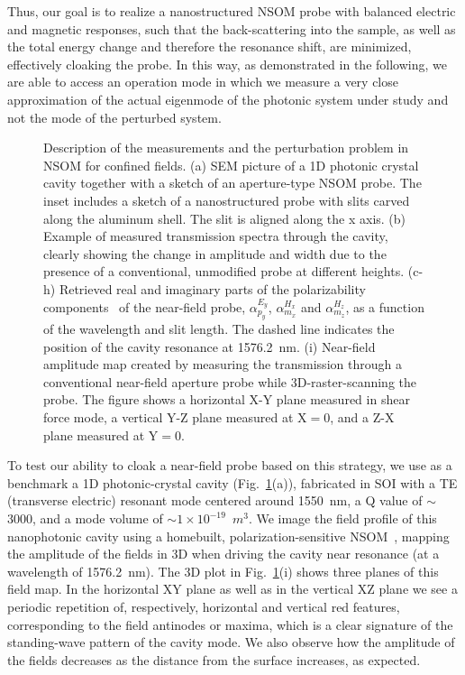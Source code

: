 \documentclass{osa-article}
\begin{document}
	Thus, our goal is to realize a nanostructured NSOM probe with balanced electric and magnetic responses, such that the back-scattering into the sample, as well as the total energy change and therefore the resonance shift, are minimized, effectively cloaking the probe. In this way, as demonstrated in the following, we are able to access an operation mode in which we measure a very close approximation of the actual eigenmode of the photonic system under study and not the mode of the perturbed system.\par
	
	\begin{figure}[htb!]
		\caption{Description of the measurements and the perturbation problem in NSOM for confined fields. (a) SEM picture of a 1D photonic crystal cavity together with a sketch of an aperture-type NSOM probe. The inset includes a sketch of a nanostructured probe with slits carved along the aluminum shell. The slit is aligned along the x axis. (b) Example of measured transmission spectra through the cavity, clearly showing the change in amplitude and width due to the presence of a conventional, unmodified probe at different heights. (c-h) Retrieved real and imaginary parts of the polarizability components~\cite{Bernal_2013,Bernal_2014} of the near-field probe, $\alpha^{E_{y}}_{p_{y}}$, $\alpha^{H_{x}}_{m_{x}}$ and $\alpha^{H_{z}}_{m_{z}}$, as a function of the wavelength and slit length. The dashed line indicates the position of the cavity resonance at 1576.2~nm. (i) Near-field amplitude map created by measuring the transmission through a conventional near-field aperture probe while 3D-raster-scanning the probe. The figure shows a horizontal X-Y plane measured in shear force mode, a vertical Y-Z plane measured at X$=0$, and a Z-X plane measured at Y$=0$.
		}\label{mappingFields}
	\end{figure}
	
	To test our ability to cloak a near-field probe based on this strategy, we use as a benchmark a 1D photonic-crystal cavity (Fig.~\ref{mappingFields}(a)), fabricated in SOI with a TE (transverse electric) resonant mode centered around 1550~nm, a Q value of $\sim$3000, and a mode volume of $\sim1\times10^{-19}$~$m^3$. We image the field profile of this nanophotonic cavity using a homebuilt, polarization-sensitive NSOM~\cite{Feber_2013}, mapping the amplitude of the fields in 3D when driving the cavity near resonance (at a wavelength of 1576.2~nm). The 3D plot in Fig.~\ref{mappingFields}(i) shows three planes of this field map. In the horizontal XY plane as well as in the vertical XZ plane we see a periodic repetition of, respectively, horizontal and vertical red features, corresponding to the field antinodes or maxima, which is a clear signature of the standing-wave pattern of the cavity mode. We also observe how the amplitude of the fields decreases as the distance from the surface increases, as expected.\par
	
\end{document}
